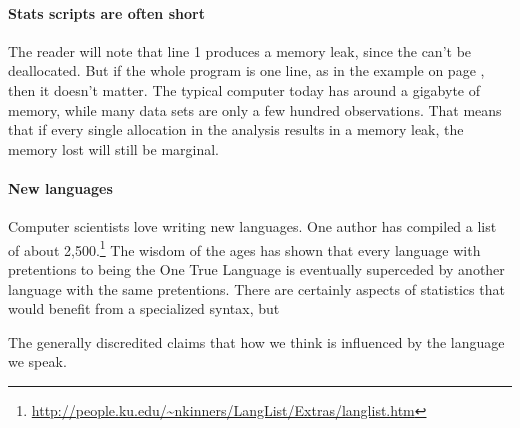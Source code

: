{\paragraph{Stats scripts are often short}
The reader will note that line 1 produces a memory leak, since the
 can't be deallocated. But if the whole program
is one line, as in the example on page \pageref{oneliner}, then it
doesn't matter. The typical computer today has around a gigabyte of
memory, while many data sets are only a few hundred observations. That
means that if every single allocation in the analysis results in a memory
leak, the memory lost will still be marginal.


\paragraph{New languages} Computer scientists love writing new
languages.  One author has compiled a list of about
2,500.\footnote{\url{http://people.ku.edu/~nkinners/LangList/Extras/langlist.htm}}
The wisdom of the ages has shown that every language with pretentions
to being the One True Language is eventually superceded by another
language with the same pretentions. There are certainly aspects of
statistics that would benefit from a specialized syntax, but 




The
generally discredited  claims that how we
think is influenced by the language we speak. 

}


